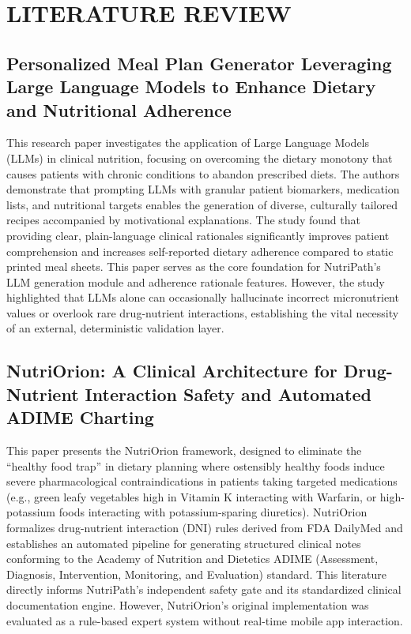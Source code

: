 \documentclass[a4paper,12pt]{report}
\begin{document}
\chapter{LITERATURE REVIEW}

\section{Personalized Meal Plan Generator Leveraging Large Language Models to Enhance Dietary and Nutritional Adherence}

\hspace{1cm}This research paper investigates the application of Large Language Models (LLMs) in clinical nutrition, focusing on overcoming the dietary monotony that causes patients with chronic conditions to abandon prescribed diets. The authors demonstrate that prompting LLMs with granular patient biomarkers, medication lists, and nutritional targets enables the generation of diverse, culturally tailored recipes accompanied by motivational explanations. The study found that providing clear, plain-language clinical rationales significantly improves patient comprehension and increases self-reported dietary adherence compared to static printed meal sheets. This paper serves as the core foundation for NutriPath's LLM generation module and adherence rationale features. However, the study highlighted that LLMs alone can occasionally hallucinate incorrect micronutrient values or overlook rare drug-nutrient interactions, establishing the vital necessity of an external, deterministic validation layer. \cite{one}

\section{NutriOrion: A Clinical Architecture for Drug-Nutrient Interaction Safety and Automated ADIME Charting}

\hspace{1cm}This paper presents the NutriOrion framework, designed to eliminate the ``healthy food trap'' in dietary planning where ostensibly healthy foods induce severe pharmacological contraindications in patients taking targeted medications (e.g., green leafy vegetables high in Vitamin K interacting with Warfarin, or high-potassium foods interacting with potassium-sparing diuretics). NutriOrion formalizes drug-nutrient interaction (DNI) rules derived from FDA DailyMed and establishes an automated pipeline for generating structured clinical notes conforming to the Academy of Nutrition and Dietetics ADIME (Assessment, Diagnosis, Intervention, Monitoring, and Evaluation) standard. This literature directly informs NutriPath's independent safety gate and its standardized clinical documentation engine. However, NutriOrion's original implementation was evaluated as a rule-based expert system without real-time mobile app interaction. \cite{two}
\end{document}
